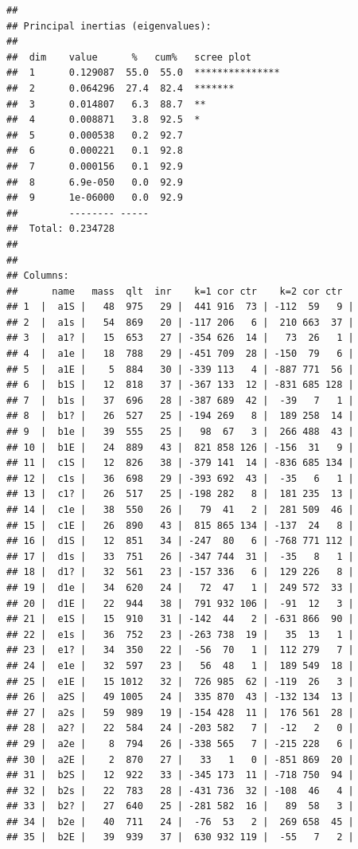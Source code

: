 \documentclass[
  finnish,
]{book}
\begin{document}
\begin{verbatim}
## 
## Principal inertias (eigenvalues):
## 
##  dim    value      %   cum%   scree plot               
##  1      0.129087  55.0  55.0  ***************          
##  2      0.064296  27.4  82.4  *******                  
##  3      0.014807   6.3  88.7  **                       
##  4      0.008871   3.8  92.5  *                        
##  5      0.000538   0.2  92.7                           
##  6      0.000221   0.1  92.8                           
##  7      0.000156   0.1  92.9                           
##  8      6.9e-050   0.0  92.9                           
##  9      1e-06000   0.0  92.9                           
##         -------- -----                                 
##  Total: 0.234728                                       
## 
## 
## Columns:
##      name   mass  qlt  inr    k=1 cor ctr    k=2 cor ctr  
## 1  |  a1S |   48  975   29 |  441 916  73 | -112  59   9 |
## 2  |  a1s |   54  869   20 | -117 206   6 |  210 663  37 |
## 3  |  a1? |   15  653   27 | -354 626  14 |   73  26   1 |
## 4  |  a1e |   18  788   29 | -451 709  28 | -150  79   6 |
## 5  |  a1E |    5  884   30 | -339 113   4 | -887 771  56 |
## 6  |  b1S |   12  818   37 | -367 133  12 | -831 685 128 |
## 7  |  b1s |   37  696   28 | -387 689  42 |  -39   7   1 |
## 8  |  b1? |   26  527   25 | -194 269   8 |  189 258  14 |
## 9  |  b1e |   39  555   25 |   98  67   3 |  266 488  43 |
## 10 |  b1E |   24  889   43 |  821 858 126 | -156  31   9 |
## 11 |  c1S |   12  826   38 | -379 141  14 | -836 685 134 |
## 12 |  c1s |   36  698   29 | -393 692  43 |  -35   6   1 |
## 13 |  c1? |   26  517   25 | -198 282   8 |  181 235  13 |
## 14 |  c1e |   38  550   26 |   79  41   2 |  281 509  46 |
## 15 |  c1E |   26  890   43 |  815 865 134 | -137  24   8 |
## 16 |  d1S |   12  851   34 | -247  80   6 | -768 771 112 |
## 17 |  d1s |   33  751   26 | -347 744  31 |  -35   8   1 |
## 18 |  d1? |   32  561   23 | -157 336   6 |  129 226   8 |
## 19 |  d1e |   34  620   24 |   72  47   1 |  249 572  33 |
## 20 |  d1E |   22  944   38 |  791 932 106 |  -91  12   3 |
## 21 |  e1S |   15  910   31 | -142  44   2 | -631 866  90 |
## 22 |  e1s |   36  752   23 | -263 738  19 |   35  13   1 |
## 23 |  e1? |   34  350   22 |  -56  70   1 |  112 279   7 |
## 24 |  e1e |   32  597   23 |   56  48   1 |  189 549  18 |
## 25 |  e1E |   15 1012   32 |  726 985  62 | -119  26   3 |
## 26 |  a2S |   49 1005   24 |  335 870  43 | -132 134  13 |
## 27 |  a2s |   59  989   19 | -154 428  11 |  176 561  28 |
## 28 |  a2? |   22  584   24 | -203 582   7 |  -12   2   0 |
## 29 |  a2e |    8  794   26 | -338 565   7 | -215 228   6 |
## 30 |  a2E |    2  870   27 |   33   1   0 | -851 869  20 |
## 31 |  b2S |   12  922   33 | -345 173  11 | -718 750  94 |
## 32 |  b2s |   22  783   28 | -431 736  32 | -108  46   4 |
## 33 |  b2? |   27  640   25 | -281 582  16 |   89  58   3 |
## 34 |  b2e |   40  711   24 |  -76  53   2 |  269 658  45 |
## 35 |  b2E |   39  939   37 |  630 932 119 |  -55   7   2 |
\end{verbatim}
\end{document}
